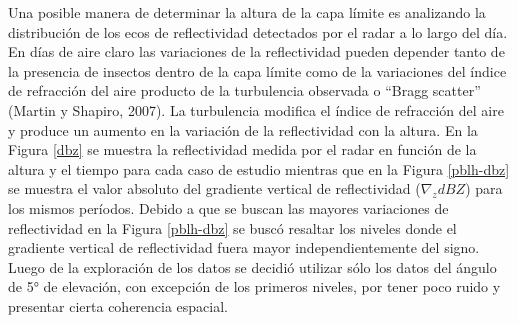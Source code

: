\documentclass[12pt,spanish,oneside, a4paper]{book}
\begin{document}
Una posible manera de determinar la altura de la capa límite es
analizando la distribución de los ecos de reflectividad detectados por
el radar a lo largo del día. En días de aire claro las variaciones de la
reflectividad pueden depender tanto de la presencia de insectos dentro
de la capa límite como de la variaciones del índice de refracción del
aire producto de la turbulencia observada o ``Bragg scatter'' (Martin y
Shapiro, 2007). La turbulencia modifica el índice de refracción del aire
y produce un aumento en la variación de la reflectividad con la altura.
En la Figura \ref{dbz} se muestra la reflectividad medida por el radar
en función de la altura y el tiempo para cada caso de estudio mientras
que en la Figura \ref{pblh-dbz} se muestra el valor absoluto del
gradiente vertical de reflectividad (\(\nabla_z dBZ\)) para los mismos
períodos. Debido a que se buscan las mayores variaciones de
reflectividad en la Figura \ref{pblh-dbz} se buscó resaltar los niveles
donde el gradiente vertical de reflectividad fuera mayor
independientemente del signo. Luego de la exploración de los datos se
decidió utilizar sólo los datos del ángulo de 5° de elevación, con
excepción de los primeros niveles, por tener poco ruido y presentar
cierta coherencia espacial.
\end{document}
